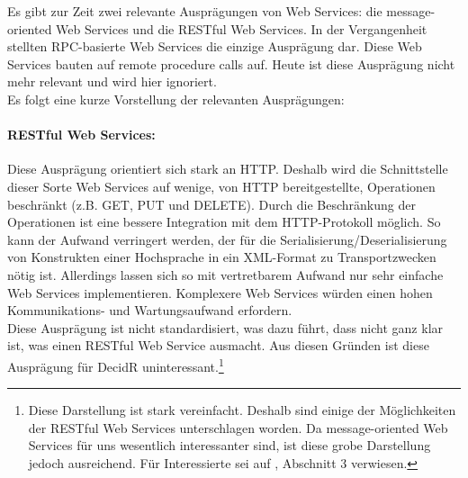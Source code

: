\documentclass[runningheads]{llncs}
\newcommand{\germanquote}[1]{\glqq{}#1\grqq{}}
\newcommand{\decidr}{DecidR}
\begin{document}
    Es gibt zur Zeit zwei relevante Ausprägungen von Web Services: die
    \germanquote{message-oriented Web Services} und die \germanquote{RESTful Web Services}. In der
    Vergangenheit stellten RPC-basierte Web Services die einzige Ausprägung dar. Diese Web Services
    bauten auf \germanquote{remote procedure calls} auf. Heute ist diese Ausprägung nicht mehr
    relevant und wird hier ignoriert.\\
    Es folgt eine kurze Vorstellung der relevanten Ausprägungen:

    \paragraph{RESTful Web Services:}
      Diese Ausprägung orientiert sich stark an HTTP. Deshalb wird die Schnittstelle dieser Sorte
      Web Services auf wenige, von HTTP bereitgestellte, Operationen beschränkt (z.B. GET, PUT und
      DELETE). Durch die Beschränkung der Operationen ist eine bessere Integration mit dem
      HTTP-Protokoll möglich. So kann der Aufwand verringert werden, der für die
      Serialisierung/Deserialisierung von Konstrukten einer Hochsprache in ein XML-Format zu
      Transportzwecken nötig ist. Allerdings lassen sich so mit vertretbarem Aufwand nur sehr
      einfache Web Services implementieren. Komplexere Web Services würden einen hohen
      Kommunikations- und Wartungsaufwand erfordern.\\
      Diese Ausprägung ist nicht standardisiert, was dazu führt, dass nicht ganz klar ist, was
      einen RESTful Web Service ausmacht. Aus diesen Gründen ist diese Ausprägung für \decidr{}
      uninteressant.\footnote{Diese Darstellung ist stark vereinfacht. Deshalb sind einige der
      Möglichkeiten der RESTful Web Services unterschlagen worden. Da message-oriented Web Services
      für uns wesentlich interessanter sind, ist diese grobe Darstellung jedoch ausreichend. Für
      Interessierte sei auf \cite{paper_pautasso}, Abschnitt 3 verwiesen.}
\end{document}

